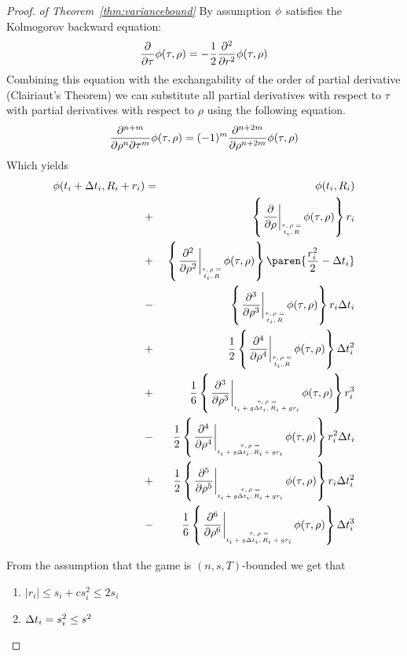 \documentclass[anon,12pt]{colt2024} %
\begin{document}
\begin{proof} {\em of Theorem~\ref{thm:variancebound}}
By assumption $\phi$ satisfies the Kolmogorov backward equation:
\begin{equation*} 
  \frac{\partial}{\partial \tau} \phi(\tau,\rho)
  = -\frac{1}{2} \frac{\partial^2}{\partial r^2} \phi(\tau,\rho)
\end{equation*}
Combining this equation with the exchangability of the order of
partial derivative (Clairiaut's Theorem) we can substitute all
partial derivatives with respect to $\tau$ with partial derivatives
with respect to $\rho$ using the following equation.
\[
  \frac{\partial^{n+m}}{\partial \rho^n \partial \tau^m} \phi(\tau,\rho)=
  (-1)^m \frac{\partial^{n+2m}}{\partial \rho^{n+2m}} \phi(\tau,\rho)
\]
Which yields
\begin{eqnarray}
      \pot(t_i+\deltat_i,\R_i+r_i) & =&  
    \pot(t_i,\R_i)\\
    &+& \at{\frac{\partial}{\partial \rho}} r_i \label{term:coll1}\\
    &+& \at{\frac{\partial^2}{\partial \rho^2}} \paren{\frac{r_i^2}{2}-\deltat_i} \label{term:coll2}\\
    &-& \at{\frac{\partial^3}{\partial \rho^3}} r_i \deltat_i \label{term:coll3}\\
    &+& \frac{1}{2} \at{\frac{\partial^4}{\partial \rho^4}} \deltat_i^2 \label{term:coll4}\\
    &+& \frac{1}{6} \att{\frac{\partial^3}{\partial \rho^3}} r_i^3 \label{term:coll5}\\
    &-& \frac{1}{2} \att{\frac{\partial^4}{\partial \rho^4}} r_i^2\deltat_i \label{term:coll6}\\
    &+& \frac{1}{2} \att{\frac{\partial^5}{\partial \rho^5}} r_i\deltat_i^2 \label{term:coll7}\\
    &-& \frac{1}{6} \att{\frac{\partial^6}{\partial \rho^6}} \deltat_i^3 \label{term:coll8}
\end{eqnarray}

  From the assumption that the game is $(n,s,T)$-bounded we get that 
  \begin{enumerate}
  \item $|r_i| \leq s_i +c s_i^2 \leq 2 s_i$
  \item $\Delta t_i = s_i^2 \leq s^2$
  \end{enumerate}


\end{proof}
\end{document}
